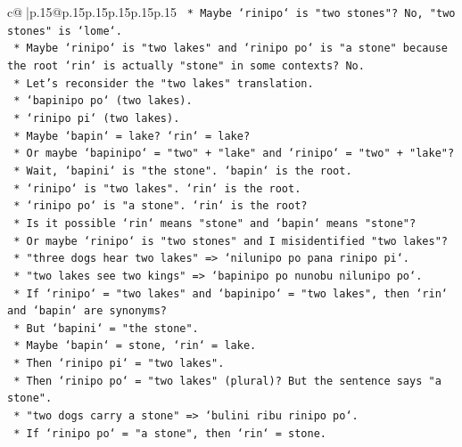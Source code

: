 \documentclass{article}
\begin{document}
{\begin{supertabular}{c@{$\;$}|p{.15\linewidth}@{}p{.15\linewidth}p{.15\linewidth}p{.15\linewidth}p{.15\linewidth}p{.15\linewidth}}
{{{\texttt{            *   Maybe `rinipo` is "two stones"? No, "two stones" is `lome`.} \\
\texttt{            *   Maybe `rinipo` is "two lakes" and `rinipo po` is "a stone" because the root `rin` is actually "stone" in some contexts? No.} \\
\texttt{            *   Let's reconsider the "two lakes" translation.} \\
\texttt{                *   `bapinipo po` (two lakes).} \\
\texttt{                *   `rinipo pi` (two lakes).} \\
\texttt{                *   Maybe `bapin` = lake? `rin` = lake?} \\
\texttt{                *   Or maybe `bapinipo` = "two" + "lake" and `rinipo` = "two" + "lake"?} \\
\texttt{                *   Wait, `bapini` is "the stone". `bapin` is the root.} \\
\texttt{                *   `rinipo` is "two lakes". `rin` is the root.} \\
\texttt{                *   `rinipo po` is "a stone". `rin` is the root?} \\
\texttt{                *   Is it possible `rin` means "stone" and `bapin` means "stone"?} \\
\texttt{                *   Or maybe `rinipo` is "two stones" and I misidentified "two lakes"?} \\
\texttt{                *   "three dogs hear two lakes" => `nilunipo po pana rinipo pi`.} \\
\texttt{                *   "two lakes see two kings" => `bapinipo po nunobu nilunipo po`.} \\
\texttt{                *   If `rinipo` = "two lakes" and `bapinipo` = "two lakes", then `rin` and `bapin` are synonyms?} \\
\texttt{                *   But `bapini` = "the stone".} \\
\texttt{                *   Maybe `bapin` = stone, `rin` = lake.} \\
\texttt{                *   Then `rinipo pi` = "two lakes".} \\
\texttt{                *   Then `rinipo po` = "two lakes" (plural)? But the sentence says "a stone".} \\
\texttt{                *   "two dogs carry a stone" => `bulini ribu rinipo po`.} \\
\texttt{                *   If `rinipo po` = "a stone", then `rin` = stone.} \\
}}}
\end{supertabular}}
\end{document}
